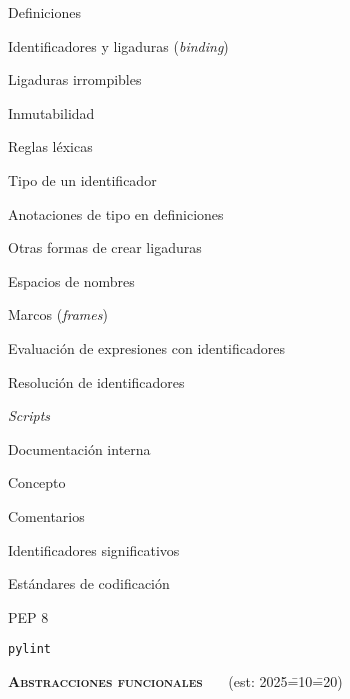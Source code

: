 \begin{longenum}
\begin{longenum}
\begin{longenum}
        \end{longenum}
        \item Definiciones
        \begin{longenum}
            \item Identificadores y ligaduras (\textit{binding})
            \begin{longenum}
                \item Ligaduras irrompibles
                \item Inmutabilidad
                \item Reglas léxicas
                \item Tipo de un identificador
                \item Anotaciones de tipo en definiciones
                \item Otras formas de crear ligaduras
            \end{longenum}
            \item Espacios de nombres
            \item Marcos (\textit{frames})
            \item Evaluación de expresiones con identificadores
            \begin{longenum}
                \item Resolución de identificadores
            \end{longenum}
        \end{longenum}
        \item \textit{Scripts}
        \item Documentación interna
        \begin{longenum}
            \item Concepto
            \item Comentarios
            \item Identificadores significativos
            \item Estándares de codificación
            \begin{longenum}
                \item PEP 8
                \item \texttt{pylint}
            \end{longenum}
        \end{longenum}
    \end{longenum}
    \item \textbf{\textsc{Abstracciones funcionales}} \ \ \ (est: 2025\==10\==20)
    \begin{longenum}

\end{longenum}
\end{longenum}
